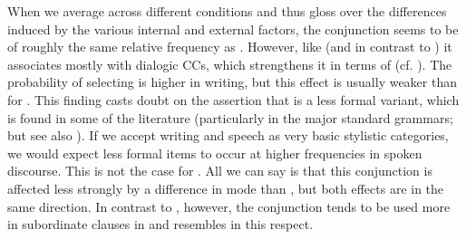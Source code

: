 \begin{sloppypar}
  When we average across different conditions and thus gloss over the differences induced by the various internal and external factors, the conjunction  seems to be of roughly the same relative frequency as . However, like  (and in contrast to ) it associates mostly with dialogic CCs, which strengthens it in terms of  (cf. ). The probability of selecting  is higher in writing, but this effect is usually weaker than for . This finding casts doubt on the assertion that  is a less formal variant, which is found in some of the literature (particularly in the major standard grammars; but see also \citealt{Aarts1988}). If we accept writing and speech as very basic stylistic categories, we would expect less formal items to occur at higher frequencies in spoken discourse. This is not the case for . All we can say is that this conjunction is affected less strongly by a difference in mode than , but both effects are in the same direction. In contrast to , however, the conjunction  tends to be used more in subordinate clauses in  and resembles  in this respect.
\end{sloppypar}


